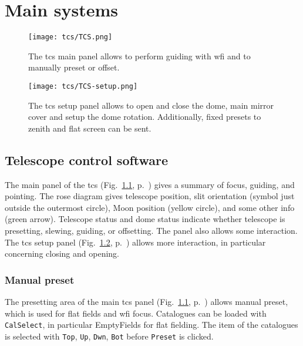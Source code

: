 \documentclass[11pt,fleqn]{book}
\def\figref#1{Fig.~\ref{fig:#1}, p.~\pageref{fig:#1}}
\begin{document}


\chapter{Main systems}
\label{chap:compo}


\begin{figure}[!ht]
\centering
\texttt{[image: tcs/TCS.png]}
\caption[Main panel of the telescope control software]{The \gls{tcs} main panel allows to perform guiding with \gls{wfi} and to manually preset or offset.}
\label{fig:tcs}
\end{figure}

\begin{figure}[!ht]
\centering
\texttt{[image: tcs/TCS-setup.png]}
\caption[Setup panel of the telescope control software]{The \gls{tcs} setup panel allows to open and close the dome, main
mirror cover and setup the dome rotation.  Additionally, fixed presets
to zenith and flat screen can be sent.}
\label{fig:tcssetup}
\end{figure}

\section{Telescope control software}

The main panel of the \gls{tcs} (\figref{tcs}) gives a summary of focus,
guiding, and pointing. The rose diagram gives telescope position, slit
orientation (symbol just outside the outermost circle), Moon position (yellow
circle), and some other info (green arrow). Telescope status and dome status
indicate whether telescope is presetting, slewing, guiding, or offsetting.  The
panel also allows some interaction.  The \gls{tcs} setup panel
(\figref{tcssetup}) allows more interaction, in particular concerning
closing and opening.

\subsection{Manual preset}  
\label{manualpreset}


The presetting area  of the main \gls{tcs} panel (\figref{tcs}) allows manual
preset, which is used for flat fields and \gls{wfi} focus.  Catalogues can be loaded
with \texttt{CalSelect}, in particular EmptyFields for flat fielding. The item
of the catalogues is selected with \texttt{Top}, \texttt{Up}, \texttt{Dwn},
\texttt{Bot} before \texttt{Preset} is clicked.
\end{document}
